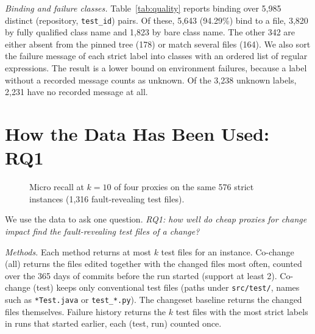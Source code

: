 \documentclass[10pt,conference]{IEEEtran}
\begin{document}
\textit{Binding and failure classes.} Table~\ref{tab:quality} reports binding over 5,985 distinct (repository, \texttt{test\_id}) pairs. Of these, 5,643 (94.29\%) bind to a file, 3,820 by fully qualified class name and 1,823 by bare class name. The other 342 are either absent from the pinned tree (178) or match several files (164). We also sort the failure message of each strict label into classes with an ordered list of regular expressions. The result is a lower bound on environment failures, because a label without a recorded message counts as unknown. Of the 3,238 unknown labels, 2,231 have no recorded message at all.

\section{How the Data Has Been Used: RQ1}
\label{sec:rq1}

\begin{figure}[t]
\centering
\vspace{-4pt}
\vspace{-6pt}
\caption{Micro recall at $k=10$ of four proxies on the same 576 strict instances (1,316 fault-revealing test files).}
\label{fig:rq1}
\vspace{-6pt}
\end{figure}

We use the data to ask one question. \textit{RQ1: how well do cheap proxies for change impact find the fault-revealing test files of a change?}

\textit{Methods.} Each method returns at most $k$ test files for an instance. Co-change (all) returns the files edited together with the changed files most often, counted over the 365 days of commits before the run started (support at least 2). Co-change (test) keeps only conventional test files (paths under \texttt{src/test/}, names such as \texttt{*Test.java} or \texttt{test\_*.py}). The changeset baseline returns the changed files themselves. Failure history returns the $k$ test files with the most strict labels in runs that started earlier, each (test, run) counted once.
\end{document}
